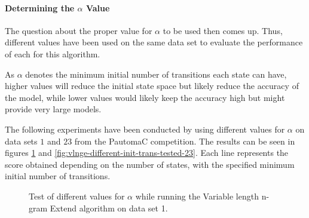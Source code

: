 \paragraph{Determining the $\alpha$ Value}

The question about the proper value for $\alpha$ to be used then comes up. Thus, different values have been used on the same data set to evaluate the performance of each for this algorithm.

As $\alpha$ denotes the minimum initial number of transitions each state can have, higher values will reduce the initial state space but likely reduce the accuracy of the model, while lower values would likely keep the accuracy high but might provide very large models.

The following experiments have been conducted by using different values for $\alpha$ on data sets $1$ and $23$ from the PautomaC competition. The results can be seen in figures \ref{fig:vlnge-different-init-trans-tested-1} and \ref{fig:vlnge-different-init-trans-tested-23}. Each line represents the score obtained depending on the number of states, with the specified minimum initial number of transitions.


\begin{figure}[!h]
\begin{centering}
\caption{Test of different values for $\alpha$ while running the Variable length n-gram Extend algorithm on data set 1.}
\label{fig:vlnge-different-init-trans-tested-1} 
\end{centering}
\end{figure}


